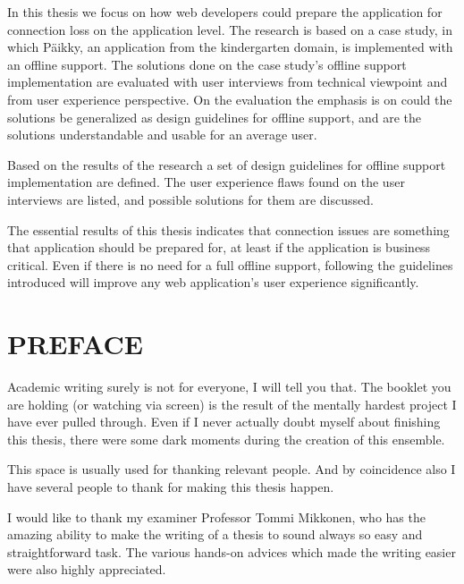 In this thesis we focus on how web developers could prepare the application for connection loss on the application level. The research is based on a case study, in which Päikky, an application from the kindergarten domain, is implemented with an offline support. The solutions done on the case study's offline support implementation are evaluated with user interviews from technical viewpoint and from user experience perspective. On the evaluation the emphasis is on could the solutions be generalized as design guidelines for offline support, and are the solutions understandable and usable for an average user.

Based on the results of the research a set of design guidelines for offline support implementation are defined. The user experience flaws found on the user interviews are listed, and possible solutions for them are discussed.

The essential results of this thesis indicates that connection issues are something that application should be prepared for, at least if the application is business critical. Even if there is no need for a full offline support, following the guidelines introduced will improve any web application's user experience significantly.







\newpage
 
\chapter*{PREFACE}
\noindent 


Academic writing surely is not for everyone, I will tell you that. The booklet you are holding (or watching via screen) is the result of the mentally hardest project I have ever pulled through. Even if I never actually doubt myself about finishing this thesis, there were some dark moments during the creation of this ensemble. 

This space is usually used for thanking relevant people. And by coincidence also I have several people to thank for making this thesis happen.

I would like to thank my examiner Professor Tommi Mikkonen, who has the amazing ability to make the writing of a thesis to sound always so easy and straightforward task. The various hands-on advices which made the writing easier were also highly appreciated.


